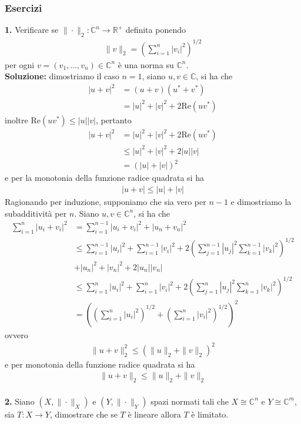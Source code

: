 \documentclass{article}
\numberwithin{equation}{subsection}
\begin{document}
\subsubsection{Esercizi}
\textbf{1.} Verificare se $\|\cdot\|_2 : \mathbb{C}^n \longrightarrow \mathbb{R}^+$ definita ponendo
\begin{align*}
    \|v\|_2 = \left(\sum_{i = 1}^n|v_i|^2\right)^{1/2} 
\end{align*}
per ogni $v = (v_1, \dots, v_n) \in \mathbb{C}^n$ è una norma su $\mathbb{C}^n$. \\

\textbf{Soluzione:} dimostriamo il caso $n = 1$, siano $u, v \in \mathbb{C}$, si ha che
\begin{align*}
    |u + v|^2 &= (u + v)(u^* + v^*)  \\
    &= |u|^2 + |v|^2 + 2\mathrm{Re}(uv^*) 
\end{align*}
inoltre $\mathrm{Re}(uv^*) \leq |u||v|$, pertanto
\begin{align*}
    |u + v|^2 &= |u|^2 + |v|^2 + 2\mathrm{Re}(uv^*)  \\
    &\leq |u|^2 + |v|^2 + 2|u||v|  \\
    &= (|u| + |v|)^2 
\end{align*}
e per la monotonia della funzione radice quadrata si ha
\begin{align*}
    |u + v| \leq |u| + |v| 
\end{align*}
Ragionando per induzione, supponiamo che sia vero per $n - 1$ e dimostriamo la subadditività per $n$. Siano $u, v \in \mathbb{C}^n$, si ha che
\begin{align*}
    \sum_{i = 1}^n |u_i + v_i|^2 &= \sum_{i = 1}^{n - 1}|u_i + v_i|^2 + |u_n + v_n|^2  \\
    &\leq \sum_{i = 1}^{n - 1}|u_i|^2 + \sum_{i = 1}^{n - 1}|v_i|^2 + 2\left(\sum_{j = 1}^{n - 1}|u_j|^2\sum_{k = 1}^{n - 1}|v_k|^2\right)^{1/2}  \\
    &+ |u_n|^2 + |v_n|^2 + 2|u_n||v_n|  \\
    &\leq \sum_{i = 1}^n|u_i|^2 + \sum_{i = 1}^n|v_i|^2 + 2\left(\sum_{j = 1}^n|u_j|^2\sum_{k = 1}^n|v_k|^2\right)^{1/2}  \\
    &= \left(\left(\sum_{i = 1}^n|u_i|^2\right)^{1/2} + \left(\sum_{i = 1}^n|v_i|^2\right)^{1/2}\right)^{2} 
\end{align*}
ovvero
\begin{align*}
    \|u + v\|^2_2 \leq (\|u\|_2 + \|v\|_2)^2 
\end{align*}
e per monotonia della funzione radice quadrata si ha
\begin{align*}
    \|u + v\|_2 \leq \|u\|_2 + \|v\|_2 
\end{align*} \\
\textbf{2.} Siano $(X, \|\cdot\|_X)$ e $(Y, \|\cdot\|_Y)$ spazi normati tali che $X \cong \mathbb{C}^n$ e $Y \cong \mathbb{C}^m$, sia $T : X \longrightarrow Y$, dimostrare che se $T$ è lineare allora $T$ è limitato. \\
\end{document}
